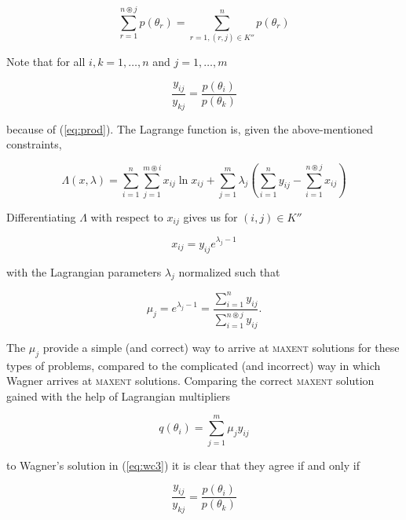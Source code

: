 \documentclass[11pt]{article}
\begin{document}
\begin{equation}
  \label{eq:dast}
  \sum_{r=1}^{n\circledast{}j}p(\theta_{r})=\sum_{r=1,(r,j)\in{}K''}^{n}p(\theta_{r})
\end{equation}

Note that for all $i,k=1,\ldots,n$ and $j=1,\ldots,m$

\begin{equation}
  \label{eq:wc4}
  \frac{y_{ij}}{y_{kj}}=\frac{p(\theta_{i})}{p(\theta_{k})}
\end{equation}

because of (\ref{eq:prod}). The Lagrange function is, given the
above-mentioned constraints,

\begin{equation}
  \label{eq:wclag}
  \Lambda(x,\lambda)=\sum_{i=1}^{n}\sum_{j=1}^{m\circledast{}i}x_{ij}\ln{}x_{ij}+\sum_{j=1}^{m}\lambda_{j}\left(\sum_{i=1}^{n}y_{ij}-\sum_{i=1}^{n\circledast{}j}x_{ij}\right)
\end{equation}

Differentiating $\Lambda$ with respect to $x_{ij}$ gives us for $(i,j)\in{}K''$

\begin{equation}
  \label{eq:wc5}
  x_{ij}=y_{ij}e^{\lambda_{j}-1}
\end{equation}

with the Lagrangian parameters $\lambda_{j}$ normalized such that

\begin{equation}
  \label{eq:wc6}
  \mu_{j}=e^{\lambda_{j}-1}=\frac{\sum_{i=1}^{n}y_{ij}}{\sum_{i=1}^{n\circledast{}j}y_{ij}}.
\end{equation}

The $\mu_{j}$ provide a simple (and correct) way to arrive at
\textsc{maxent} solutions for these types of problems, compared to the
complicated (and incorrect) way in which Wagner arrives at
\textsc{maxent} solutions. Comparing the correct \textsc{maxent}
solution gained with the help of Lagrangian multipliers

\begin{equation}
  \label{eq:wc7}
  q(\theta_{i})=\sum_{j=1}^{m}\mu_{j}y_{ij}
\end{equation}

to Wagner's solution in (\ref{eq:wc3}) it is clear that they agree if
and only if

\begin{equation}
  \label{eq:wc8}
  \frac{y_{ij}}{y_{kj}}=\frac{p(\theta_{i})}{p(\theta_{k})}
\end{equation}
\end{document}
